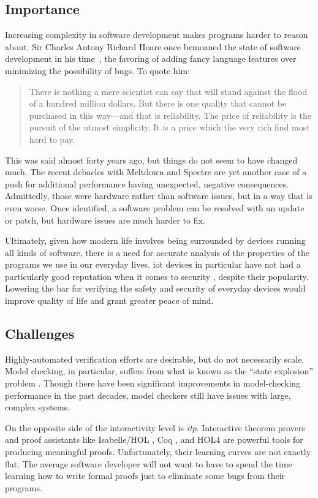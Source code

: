 \subsection{Importance}
Increasing complexity in software development makes programs harder to reason about.
Sir Charles Antony Richard Hoare
once bemoaned the state of software development in his time~\autocite{hoare1980clothes},
the favoring of adding fancy language features over minimizing the possibility of bugs.
To quote him:
\begin{quote}
  There is nothing a mere scientist can say that will stand against the flood of a hundred million dollars. But there is one quality that cannot be purchased in this way---and that is reliability. The price of reliability is the pursuit of the utmost simplicity. It is a price which the very rich find most hard to pay.
\end{quote}
This was said almost forty years ago, but things do not seem to have changed much.
The recent debacles with Meltdown and Spectre \cite{lipp2018meltdown,kocher2018spectre}
are yet another case of a push for additional performance having unexpected,
negative consequences.
Admittedly, those were hardware rather than software issues,
but in a way that is even worse. Once identified, a software problem can be resolved
with an update or patch, but hardware issues are much harder to fix.

Ultimately, given how modern life involves being surrounded by devices
running all kinds of software, there is a need for accurate analysis
of the properties of the programs we use in our everyday lives.
\Ac{iot} devices in particular have not had a particularly good reputation
when it comes to security \autocite{zhang2014iot,zhao2013iot}, despite their popularity.
Lowering the bar for verifying the safety and security of everyday devices
would improve quality of life and grant greater peace of mind.

\subsection{Challenges}
Highly-automated verification efforts are desirable, but do not necessarily scale.
Model checking, in particular, suffers from what is known as the
``state explosion'' problem \autocite{clarke2012modelchecking}.
Though there have been significant improvements in model-checking performance
in the past decades, model checkers still have issues with large, complex systems.

On the opposite side of the interactivity level is \emph{\ac{itp}}.
Interactive theorem provers and proof assistants
like Isabelle/HOL \autocite{nipkow2002isabelle}, Coq \autocite{chlipala2013certified},
and HOL4 \cite{slind2008brief} are powerful tools for producing meaningful proofs.
Unfortunately, their learning curves are not exactly flat.
The average software developer will not want to have to spend the time
learning how to write formal proofs just to eliminate some bugs from their programs.

